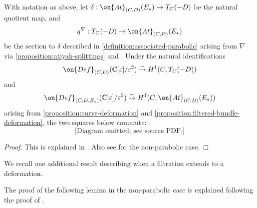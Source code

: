 \begin{proposition}
\notready
	\label{proposition:connection-h1}
	With notation as above, let $\delta: \on{At}_{(C,D)}(E_\star)\to T_C(-D)$ be the natural quotient map, and
$$q^\nabla: T_C(-D)\to\on{At}_{(C,D)}({E_\star})$$ be the section to $\delta$
described in \autoref{definition:associated-parabolic}
arising
from $\nabla$ via \autoref{proposition:atiyah-splittings} and
\cite[Lemma 4.1]{BHH:parabolic}.
    Under the natural identifications
    $$\on{Def}_{(C,D)}(\mathbb{C}[\varepsilon]/\varepsilon^2)\overset{\sim}{\to}
    H^1(C, T_C(-D))$$ and $$\on{Def}_{(C,D,
    {E_\star})}(\mathbb{C}[\varepsilon]/\varepsilon^2)\overset{\sim}{\to} H^1(C,
    \on{At}_{(C,D)}({E_\star}))$$
    arising from \autoref{proposition:curve-deformation} and \autoref{proposition:filtered-bundle-deformation}, the two squares below commute:
    $$\text{[Diagram omitted; see source PDF.]}$$
   \end{proposition}
\begin{proof}
	This is explained in \cite[Lemma 3.1 and Lemma 4.3]{BHH:parabolic}.
	Also see \cite[\S2.2 and \S 4.1]{BHH:logarithmic} for the non-parabolic
	case.
\end{proof}
We recall one additional result describing when a filtration extends to a
deformation.

The proof of the following lemma in the non-parabolic case is explained following the proof of
\cite[Lemma 3.1]{BHH:logarithmic}.

